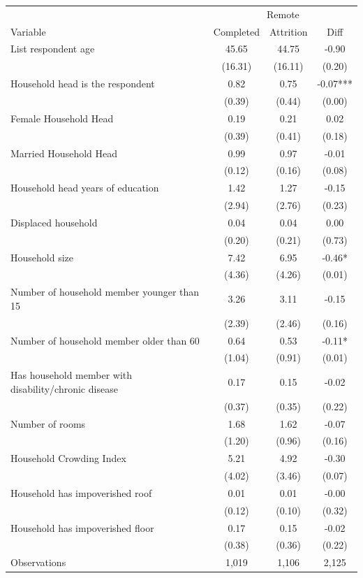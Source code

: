\begin{tabular}{l*{3}c}
\hline\hline
 & \multicolumn{3}{c}{Remote}\\ 
Variable & Completed & Attrition & Diff \\
\hline
List respondent age&45.65&44.75&-0.90\\
&(16.31)&(16.11)&(0.20)\\
Household head is the respondent&0.82&0.75&-0.07***\\
&(0.39)&(0.44)&(0.00)\\
Female Household Head&0.19&0.21&0.02\\
&(0.39)&(0.41)&(0.18)\\
Married Household Head&0.99&0.97&-0.01\\
&(0.12)&(0.16)&(0.08)\\
Household head years of education&1.42&1.27&-0.15\\
&(2.94)&(2.76)&(0.23)\\
Displaced household&0.04&0.04&0.00\\
&(0.20)&(0.21)&(0.73)\\
Household size&7.42&6.95&-0.46*\\
&(4.36)&(4.26)&(0.01)\\
Number of household member younger than 15&3.26&3.11&-0.15\\
&(2.39)&(2.46)&(0.16)\\
Number of household member older than 60&0.64&0.53&-0.11*\\
&(1.04)&(0.91)&(0.01)\\
Has household member with disability/chronic disease&0.17&0.15&-0.02\\
&(0.37)&(0.35)&(0.22)\\
Number of rooms&1.68&1.62&-0.07\\
&(1.20)&(0.96)&(0.16)\\
Household Crowding Index&5.21&4.92&-0.30\\
&(4.02)&(3.46)&(0.07)\\
Household has impoverished roof&0.01&0.01&-0.00\\
&(0.12)&(0.10)&(0.32)\\
Household has impoverished floor&0.17&0.15&-0.02\\
&(0.38)&(0.36)&(0.22)\\
\hline
Observations & 1,019 & 1,106 & 2,125 \\
\hline\hline
\end{tabular}
